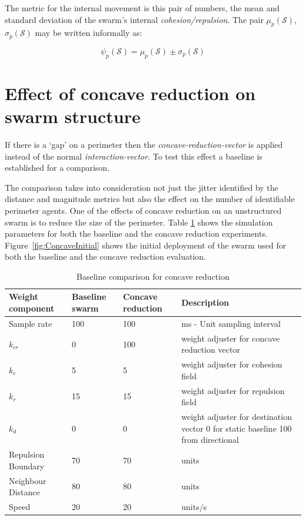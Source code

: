 \documentclass{ieeeaccess}
\begin{document}
The metric for the internal movement is this pair of numbers, the mean and standard deviation of the swarm's internal \textit{cohesion/repulsion}. The pair $\mu_p(\mathcal S)$, $\sigma_p(\mathcal S)$ may be written informally as: 

\begin{equation}
\label{eq:SwarmPotentialMagnitude}
\psi_p(\mathcal S) = \mu_p(\mathcal S)\pm \sigma_p(\mathcal S)
\end{equation}

\section{Effect of concave reduction on swarm structure}
If there is a `gap' on a perimeter then the \textit{concave-reduction-vector} is applied instead of the normal \textit{interaction-vector}. To test this effect a baseline is established for a comparison.

The comparison takes into consideration not just the jitter identified by the distance and magnitude metrics but also the effect on the number of identifiable perimeter agents. One of the effects of concave reduction on an unstructured swarm is to reduce the size of the perimeter. Table \ref{tab:BaselineConcaveReduction} shows the simulation parameters for both the baseline and the concave reduction experiments. Figure~\ref{fig:ConcaveInitial} shows the initial deployment of the swarm used for both the baseline and the concave reduction evaluation.

\begin{table}
\caption{Baseline comparison for concave reduction}\label{tab:BaselineConcaveReduction}
\begin{center}
\begin{tabular}{| p{1.4cm} | p{1.2cm} | p{1.2cm} | p{2.5cm} |}
\hline
\bf Weight \bf component & \bf Baseline \bf swarm & \bf Concave \bf reduction & \bf Description \\ \hline
Sample rate & 100 & 100 & ms - Unit sampling interval\\  \hline
$k_{cr}$ & 0 & 100 & weight adjuster for concave reduction vector\\  \hline
$k_c$ & 5 & 5 & weight adjuster for cohesion field\\  \hline
$k_r$ & 15 & 15 & weight adjuster for repulsion field\\  \hline
$k_d$ & 0 & 0 & weight adjuster for destination vector 0 for static baseline 100 from directional\\  \hline
Repulsion Boundary & 70 & 70 & units\\  \hline
Neighbour Distance & 80 & 80 & units\\  \hline
Speed & 20 & 20 & units/s\\  \hline
\end{tabular}
\end{center}
\end{table}
\end{document}
